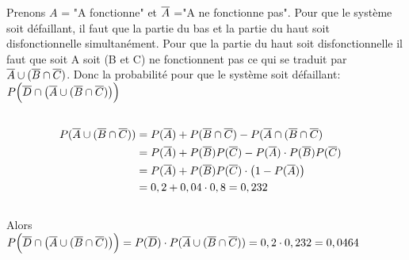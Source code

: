 \begin{exo}
  \begin{flushleft}
    Prenons $A$ = "A fonctionne" et $\overline{A}$ ="A ne fonctionne pas". Pour que le système soit défaillant, il faut que la partie du bas et la partie du haut soit disfonctionnelle simultanément. Pour que la partie du haut soit disfonctionnelle il faut que soit A soit (B et C) ne fonctionnent pas ce qui se traduit par $\overline{A} \cup (\overline{B}\cap \overline{C})$. Donc la probabilité pour que le système soit défaillant: $P\Big(\overline{D}\cap \big( \overline{A} \cup (\overline{B}\cap \overline{C})\big)\Big)$
    \begin{align*}
    \\P(\overline{A} \cup (\overline{B} \cap \overline{C}))
    &= P(\overline{A}) + P(\overline{B} \cap \overline{C}) - P(\overline{A} \cap (\overline{B} \cap \overline{C})
    \\&= P(\overline{A}) + P(\overline{B})P(\overline{C}) -  P(\overline{A})\cdot P(\overline{B})P(\overline{C})
    \\&= P(\overline{A}) + P(\overline{B})P(\overline{C}) \cdot \big(1-P(\overline{A})\big)
    \\&= 0,2 + 0,04 \cdot 0,8 = 0,232
    \end{align*}
    \\ Alors
    \\$P\Big(\overline{D}\cap \big( \overline{A} \cup (\overline{B}\cap \overline{C})\big)\Big) = P(\overline{D})\cdot P(\overline{A} \cup (\overline{B} \cap \overline{C})) = 0,2 \cdot 0,232  = 0,0464$
  \end{flushleft}
\end{exo}
